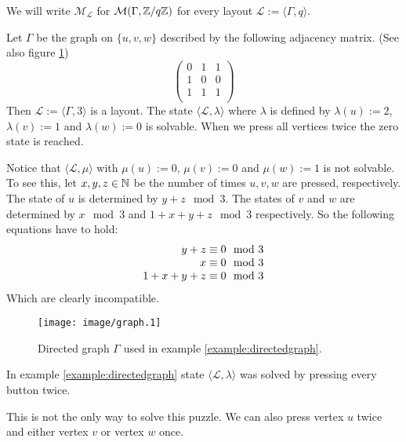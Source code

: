 \begin{remark}
	We will write $\mathcal{M}_{\mathcal{L}}$ for
	$\mathcal{M}(\Gamma,\mathbb{Z}/q\mathbb{Z})$ for every layout 
	$\mathcal{L}:=\langle\Gamma,q\rangle$.
\end{remark}

\begin{example}\label{example:directedgraph}
	Let $\Gamma$ be the graph on $\{u,v,w\}$ described by the following
	adjacency matrix. (See also figure \ref{figure:directedgraph})
	\[
		\left(
		\begin{array}{ccc}
			0 & 1 & 1 \\
			1 & 0 & 0 \\
			1 & 1 & 1 \\
		\end{array}
		\right)
	\]
	Then $\mathcal{L}:=\langle\Gamma,3\rangle$ is a layout. The state
	$\langle\mathcal{L},\lambda\rangle$ where $\lambda$ is defined by
	$\lambda(u):= 2$, $\lambda(v):= 1$ and $\lambda(w):= 0$ is solvable.
	When we press all vertices twice the zero state is reached.
	
	Notice that $\langle\mathcal{L},\mu\rangle$ with $\mu(u):= 0$, $\mu(v):=
	0$ and $\mu(w):= 1$ is not solvable. To see this, let $x,y,z\in\mathbb{N}$ be
	the number of times $u,v,w$ are pressed, respectively. The state of $u$
	is determined by $y+z \mod 3$. The states of $v$ and $w$ are determined
	by $x \mod 3$ and $1+x+y+z \mod 3$ respectively. So the	following
	equations have to hold:
	\[
		\begin{array}{r@{\;\equiv\;}l<{\mod 3}}
			y + z         & 0\\
			x             & 0\\
			1 + x + y + z & 0\\
		\end{array}
	\]
	Which are clearly incompatible.
	\begin{figure}
		\begin{center}
			\texttt{[image: image/graph.1]}
		\end{center}
		\caption{Directed graph $\Gamma$ used in example
		\ref{example:directedgraph}.}
		\label{figure:directedgraph}
	\end{figure}
\end{example}

\begin{remark}
	In example \ref{example:directedgraph} state
	$\langle\mathcal{L},\lambda\rangle$ was solved by pressing every button
	twice.
	
	This is not the only way to solve this puzzle. We can also press vertex
	$u$ twice and either vertex $v$ or vertex $w$ once.
\end{remark}


